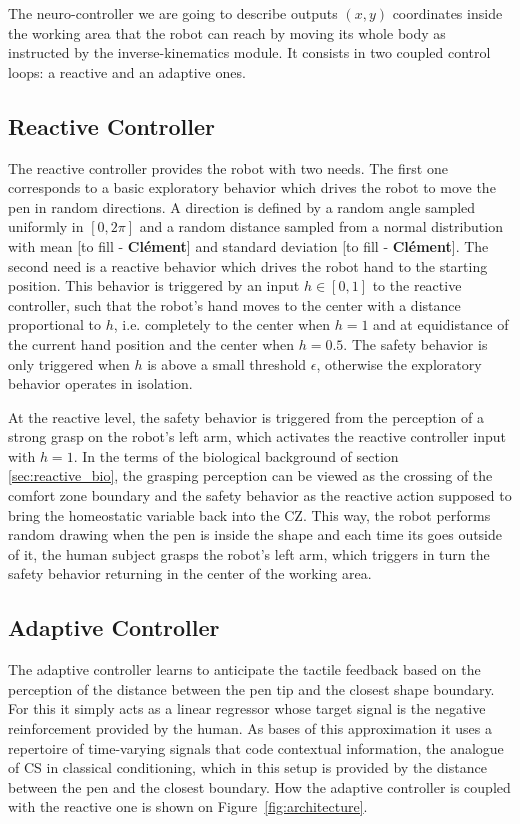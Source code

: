 \documentclass[letterpaper, 10 pt, conference]{ieeeconf}  %
\newcommand\cmf[1]{{\footnotesize \color{red}[#1 - \textbf{Cl\'ement}]}} %
\begin{document}
The neuro-controller we are going to describe outputs $(x, y)$ coordinates inside the working area that the robot can reach by moving its whole body as instructed by the inverse-kinematics module. It consists in two coupled control loops: a reactive and an adaptive ones.

\subsection{Reactive Controller}

The reactive controller provides the robot with two needs. The first one corresponds to a basic exploratory behavior which drives the robot to move the pen in random directions. A direction is defined by a random angle sampled uniformly in $[0, 2\pi]$ and a random distance  sampled from a normal distribution with mean \cmf{to fill} and standard deviation \cmf{to fill}. The second need is a reactive behavior which drives the robot hand to the starting position. This behavior is triggered by an input $h \in [0,1]$ to the reactive controller, such that the robot's hand moves to the center with a distance proportional to $h$, i.e. completely to the center when $h=1$ and at equidistance of the current hand position and the center when $h=0.5$. The safety behavior is only triggered when $h$ is above a small threshold $\epsilon$, otherwise the exploratory behavior operates in isolation. 

At the reactive level, the safety behavior is triggered from the perception of a strong grasp on the robot's left arm, which activates the reactive controller input with $h=1$. In the terms of the biological background of section \ref{sec:reactive_bio}, the grasping perception can be viewed as the crossing of the comfort zone boundary and the safety behavior as the reactive action supposed to bring the homeostatic variable back into the CZ.  This way, the robot performs random drawing when the pen is inside the shape and each time its goes outside of it, the human subject grasps the robot's left arm, which triggers in turn the safety behavior returning in the center of the working area.

\subsection{Adaptive Controller}

The adaptive controller learns to anticipate the tactile feedback based on the perception of the distance between the pen tip and the closest shape boundary. For this it simply acts as a linear regressor whose target signal is the negative reinforcement provided by the human. As bases of this approximation it uses a repertoire of time-varying signals that code contextual information, the analogue of CS in classical conditioning, which in this setup is provided by the distance between the pen and the closest boundary. How the adaptive controller is coupled with the reactive one is shown on Figure~\ref{fig:architecture}. 
\end{document}
